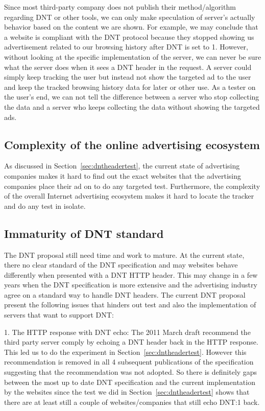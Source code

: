 \documentclass{sig-alternate}
\begin{document}
Since most third-party company does not publish their method/algorithm regarding DNT or other tools, we can only make speculation of server’s actually behavior based on the content we are shown. For example, we may conclude that a website is compliant with the DNT protocol because they stopped showing us advertisement related to our browsing history after DNT is set to 1. However, without looking at the specific implementation of the server, we can never be sure what the server does when it sees a DNT header in the request. A server could simply keep tracking the user but instead not show the targeted ad to the user and keep the tracked browsing history data for later or other use. As a tester on the user’s end, we can not tell the difference between a server who stop collecting the data and a server who keeps collecting the data without showing the targeted ads. 


\subsection{Complexity of the online advertising ecosystem} \label{sec:complexity}
As discussed in Section~\ref{sec:dntheadertest}, the current state of advertising companies makes it hard to find out the exact websites that the advertising companies place their ad on to do any targeted test. Furthermore, the complexity of the overall Internet advertising ecosystem makes it hard to locate the tracker and do any test in isolate. 

\subsection{Immaturity of DNT standard}
The DNT proposal still need time and work to mature. At the current state, there no clear standard of the DNT specification and may websites behave differently when presented with a DNT HTTP header. This may change in a few years when the DNT specification is more extensive and the advertising industry agree on a standard way to handle DNT headers. The current DNT proposal present the following issues that hinders out test and also the implementation of servers that want to support DNT:

1. The HTTP response with DNT echo:
The 2011 March draft recommend the third party server comply by echoing a DNT header back in the HTTP response. This led us to do the experiment in Section~\ref{sec:dntheadertest}. However this recommendation is removed in all 4 subsequent publications of the specification~\cite{tracking_dnt20130430, tracking_dnt20121002, tracking_dnt20120313, tracking_dnt20111114} suggesting that the recommendation was not adopted. So there is definitely gaps between the most up to date DNT specification and the current implementation by the websites since the test we did in Section~\ref{sec:dntheadertest} shows that there are at least still a couple of websites/companies that still echo DNT:1 back. 
\end{document}
